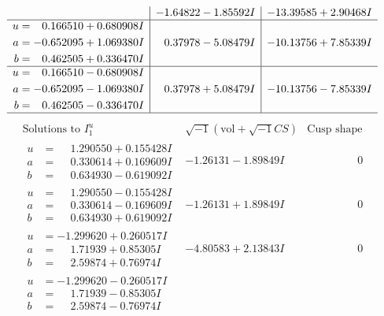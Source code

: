 \documentclass[1p]{elsarticle_modified}
\theoremstyle{definition}
\newcommand{\I}{\sqrt{-1}}
\begin{document}
$$\begin{array}{c|c|c}
 & -1.64822 - 1.85592 I & -13.39585 + 2.90468 I \\ \hline\begin{aligned}
u &= \phantom{-}0.166510 + 0.680908 I \\
a &= -0.652095 + 1.069380 I \\
b &= \phantom{-}0.462505 + 0.336470 I\end{aligned}
 & \phantom{-}0.37978 - 5.08479 I & -10.13756 + 7.85339 I \\ \hline\begin{aligned}
u &= \phantom{-}0.166510 - 0.680908 I \\
a &= -0.652095 - 1.069380 I \\
b &= \phantom{-}0.462505 - 0.336470 I\end{aligned}
 & \phantom{-}0.37978 + 5.08479 I & -10.13756 - 7.85339 I\\
 \hline 
 \end{array}$$\newpage$$\begin{array}{c|c|c}  
\text{Solutions to }I^u_{1}& \I (\text{vol} + \sqrt{-1}CS) & \text{Cusp shape}\\
 \hline 
\begin{aligned}
u &= \phantom{-}1.290550 + 0.155428 I \\
a &= \phantom{-}0.330614 + 0.169609 I \\
b &= \phantom{-}0.634930 - 0.619092 I\end{aligned}
 & -1.26131 - 1.89849 I & \phantom{-0.000000 } 0 \\ \hline\begin{aligned}
u &= \phantom{-}1.290550 - 0.155428 I \\
a &= \phantom{-}0.330614 - 0.169609 I \\
b &= \phantom{-}0.634930 + 0.619092 I\end{aligned}
 & -1.26131 + 1.89849 I & \phantom{-0.000000 } 0 \\ \hline\begin{aligned}
u &= -1.299620 + 0.260517 I \\
a &= \phantom{-}1.71939 + 0.85305 I \\
b &= \phantom{-}2.59874 + 0.76974 I\end{aligned}
 & -4.80583 + 2.13843 I & \phantom{-0.000000 } 0 \\ \hline\begin{aligned}
u &= -1.299620 - 0.260517 I \\
a &= \phantom{-}1.71939 - 0.85305 I \\
b &= \phantom{-}2.59874 - 0.76974 I\end{aligned}

\end{array}$$
\end{document}
